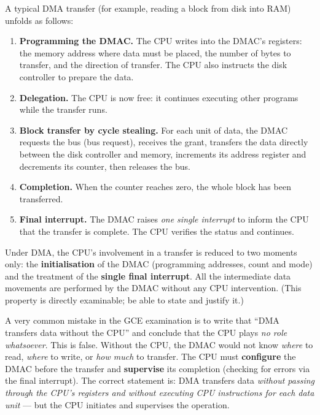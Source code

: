 \documentclass[11pt]{article}
\begin{document}
\begin{methode}
A typical DMA transfer (for example, reading a block from disk into RAM) unfolds as follows:
\begin{enumerate}
\item \textbf{Programming the DMAC.} The CPU writes into the DMAC's registers: the memory address where data must be placed, the number of bytes to transfer, and the direction of transfer. The CPU also instructs the disk controller to prepare the data.
\item \textbf{Delegation.} The CPU is now free: it continues executing other programs while the transfer runs.
\item \textbf{Block transfer by cycle stealing.} For each unit of data, the DMAC requests the bus (bus request), receives the grant, transfers the data directly between the disk controller and memory, increments its address register and decrements its counter, then releases the bus.
\item \textbf{Completion.} When the counter reaches zero, the whole block has been transferred.
\item \textbf{Final interrupt.} The DMAC raises \emph{one single interrupt} to inform the CPU that the transfer is complete. The CPU verifies the status and continues.
\end{enumerate}
\end{methode}

\begin{propriete}
Under DMA, the CPU's involvement in a transfer is reduced to two moments only: the \textbf{initialisation} of the DMAC (programming addresses, count and mode) and the treatment of the \textbf{single final interrupt}. All the intermediate data movements are performed by the DMAC without any CPU intervention. (This property is directly examinable; be able to state and justify it.)
\end{propriete}

\begin{attention}
A very common mistake in the GCE examination is to write that ``DMA transfers data without the CPU'' and conclude that the CPU plays \emph{no role whatsoever}. This is false. Without the CPU, the DMAC would not know \emph{where} to read, \emph{where} to write, or \emph{how much} to transfer. The CPU must \textbf{configure} the DMAC before the transfer and \textbf{supervise} its completion (checking for errors via the final interrupt). The correct statement is: DMA transfers data \emph{without passing through the CPU's registers and without executing CPU instructions for each data unit} — but the CPU initiates and supervises the operation.
\end{attention}
\end{document}
